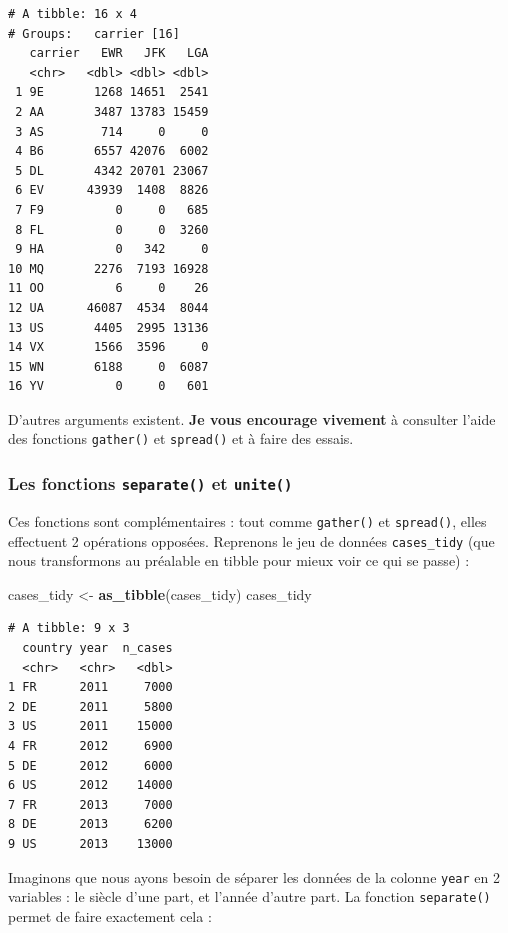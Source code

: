\documentclass[a4paperpaper,]{article}
\newenvironment{Shaded}{\begin{snugshade}}{\end{snugshade}}
\newcommand{\KeywordTok}[1]{\textcolor[rgb]{0.12,0.11,0.11}{\textbf{#1}}}
\newcommand{\NormalTok}[1]{\textcolor[rgb]{0.12,0.11,0.11}{#1}}
\newcommand{\StringTok}[1]{\textcolor[rgb]{0.75,0.01,0.01}{#1}}
\theoremstyle{definition}
\theoremstyle{definition}
\theoremstyle{definition}
\theoremstyle{remark}
\begin{document}
\begin{verbatim}
# A tibble: 16 x 4
# Groups:   carrier [16]
   carrier   EWR   JFK   LGA
   <chr>   <dbl> <dbl> <dbl>
 1 9E       1268 14651  2541
 2 AA       3487 13783 15459
 3 AS        714     0     0
 4 B6       6557 42076  6002
 5 DL       4342 20701 23067
 6 EV      43939  1408  8826
 7 F9          0     0   685
 8 FL          0     0  3260
 9 HA          0   342     0
10 MQ       2276  7193 16928
11 OO          6     0    26
12 UA      46087  4534  8044
13 US       4405  2995 13136
14 VX       1566  3596     0
15 WN       6188     0  6087
16 YV          0     0   601
\end{verbatim}

D'autres arguments existent. \textbf{Je vous encourage vivement} à
consulter l'aide des fonctions \texttt{gather()} et \texttt{spread()} et
à faire des essais.

\hypertarget{les-fonctions-separate-et-unite}{%
\subsubsection{\texorpdfstring{Les fonctions \texttt{separate()} et
\texttt{unite()}}{Les fonctions separate() et unite()}}\label{les-fonctions-separate-et-unite}}

Ces fonctions sont complémentaires : tout comme \texttt{gather()} et
\texttt{spread()}, elles effectuent 2 opérations opposées. Reprenons le
jeu de données \texttt{cases\_tidy} (que nous transformons au préalable
en tibble pour mieux voir ce qui se passe) :

\begin{Shaded}
\begin{Highlighting}[]
\NormalTok{cases_tidy <-}\StringTok{ }\KeywordTok{as_tibble}\NormalTok{(cases_tidy)}
\NormalTok{cases_tidy}
\end{Highlighting}
\end{Shaded}

\begin{verbatim}
# A tibble: 9 x 3
  country year  n_cases
  <chr>   <chr>   <dbl>
1 FR      2011     7000
2 DE      2011     5800
3 US      2011    15000
4 FR      2012     6900
5 DE      2012     6000
6 US      2012    14000
7 FR      2013     7000
8 DE      2013     6200
9 US      2013    13000
\end{verbatim}

Imaginons que nous ayons besoin de séparer les données de la colonne
\texttt{year} en 2 variables : le siècle d'une part, et l'année d'autre
part. La fonction \texttt{separate()} permet de faire exactement cela :
\end{document}
